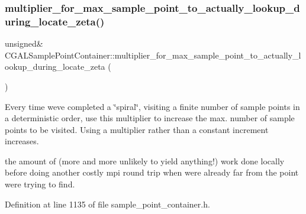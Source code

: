 \mbox{\label{classCGALSamplePointContainer_a52a64f338cef6e48a009564650608b4f}} 
\subsubsection{\texorpdfstring{multiplier\+\_\+for\+\_\+max\+\_\+sample\+\_\+point\+\_\+to\+\_\+actually\+\_\+lookup\+\_\+during\+\_\+locate\+\_\+zeta()}{multiplier\_for\_max\_sample\_point\_to\_actually\_lookup\_during\_locate\_zeta()}}
{\footnotesize\ttfamily unsigned\& C\+G\+A\+L\+Sample\+Point\+Container\+::multiplier\+\_\+for\+\_\+max\+\_\+sample\+\_\+point\+\_\+to\+\_\+actually\+\_\+lookup\+\_\+during\+\_\+locate\+\_\+zeta (\begin{DoxyParamCaption}{ }\end{DoxyParamCaption})\hspace{0.3cm}{\ttfamily [inline]}}



Every time we\textquotesingle{}ve completed a \char`\"{}spiral\char`\"{}, visiting a finite number of sample points in a deterministic order, use this multiplier to increase the max. number of sample points to be visited. Using a multiplier rather than a constant increment increases. 

the amount of (more and more unlikely to yield anything!) work done locally before doing another costly mpi round trip when we\textquotesingle{}re already far from the point we\textquotesingle{}re trying to find. 

Definition at line 1135 of file sample\+\_\+point\+\_\+container.\+h.

\mbox{\label{classCGALSamplePointContainer_a0fb2970a09f9fa0e21b04cbf7690a5a2}} 
